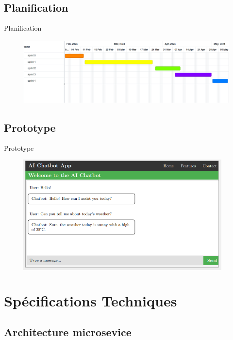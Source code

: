 \documentclass{beamer}
\begin{document}
\subsection{Planification}
\begin{frame}{Planification}
 
 \begin{figure}[htpb]
        \centering
        \includegraphics[height=3.5cm]{pic/gant-prev.png}
    \end{figure}
\end{frame}


\subsection{Prototype}
\begin{frame}{Prototype}

 \begin{figure}[htpb]
        \centering
        \includegraphics[height=6cm]{pic/prototype.png}
    \end{figure}
    
\end{frame}


\section{Spécifications Techniques}



\subsection{Architecture microsevice}
\end{document}

